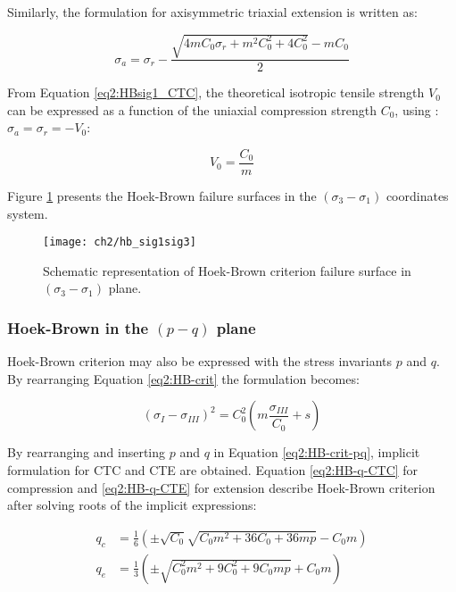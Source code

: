 Similarly, the formulation for axisymmetric triaxial extension is written as:

\begin{equation}\label{eq2:HBsig1_CTE}
    \sigma_{a}=\sigma_{r} - \frac{\sqrt{4 m C_{0} \sigma_{r}+m^{2} C_{0}^{2}+4 C_{0}^{2}}-m C_{0}}{2}
\end{equation}

From Equation \ref{eq2:HBsig1_CTC}, the theoretical isotropic tensile strength $V_0$ can be expressed as a function of the uniaxial compression strength $C_0$, using : $\sigma_a = \sigma_r = -V_0$:

\begin{equation}
    V_0 = \frac{C_0}{m}
\end{equation}

Figure \ref{fig2:hb_sig1sig3} presents the Hoek-Brown failure surfaces in the $(\sigma_3 -\sigma_1)$ coordinates system. 

\begin{figure}[tb]
    \centering
    \texttt{[image: ch2/hb\_sig1sig3]}
    \caption{Schematic representation of Hoek-Brown criterion failure surface in $(\sigma_3 -\sigma_1)$ plane.}
    \label{fig2:hb_sig1sig3}
\end{figure} 

\subsubsection{Hoek-Brown in the \texorpdfstring{$(p-q)$}{p-q} plane}

Hoek-Brown criterion may also be expressed with the stress invariants $p$ and $q$. By rearranging Equation \ref{eq2:HB-crit} the formulation becomes:

\begin{equation}\label{eq2:HB-crit-pq}
    \left(\sigma_{I}-\sigma_{III}\right)^{2}=C_{0}^{2}\left(m \frac{\sigma_{III}}{C_{0}}+s\right)
\end{equation}

By rearranging and inserting $p$  and $q$ in Equation \ref{eq2:HB-crit-pq}, implicit formulation for CTC and CTE are obtained. Equation \ref{eq2:HB-q-CTC} for compression and \ref{eq2:HB-q-CTE} for extension describe Hoek-Brown criterion after solving roots of the implicit expressions:  


\begin{align}
    q_c&=\frac{1}{6}\left(\pm \sqrt{C_{0}} \sqrt{C_{0} m^{2}+36 C_{0}+36 m p}-C_{0} m\right) \label{eq2:HB-q-CTC} \\
    q_e&=\frac{1}{3}\left(\pm \sqrt{C_{0}^{2} m^{2}+9 C_{0}^{2}+9 C_{0} m p}+C_{0} m\right) \label{eq2:HB-q-CTE}
\end{align}

